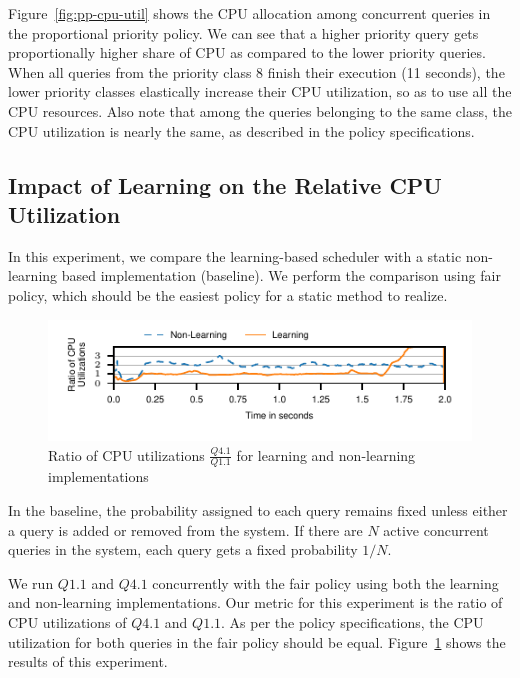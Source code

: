 Figure~\ref{fig:pp-cpu-util} shows the CPU allocation among concurrent queries in the proportional priority policy.
We can see that a higher priority query gets proportionally higher share of CPU as 
compared to the lower priority queries.
When all queries from the priority class 8 finish their execution (11 seconds), the 
lower priority classes elastically increase their CPU utilization, so as to use all the CPU 
resources. 
Also note that among the queries belonging to the same class, the CPU utilization is 
nearly the same, as described in the policy specifications.

\subsection{Impact of Learning on the Relative CPU Utilization}\label{ssec:learning-impact-cpu-util}

In this experiment, we compare the learning-based scheduler with a static non-learning based implementation (baseline).
We perform the comparison using fair policy, which should be the easiest policy for a static method to realize.

\begin{figure}
	\centering
	\includegraphics[width=\columnwidth]{policy/figures/q1-q11-ratio-cpu-util.pdf}
	\caption{Ratio of CPU utilizations  $\frac{Q4.1}{Q1.1}$ for learning and non-learning 
		implementations}
	\label{fig:non-learning-comparison}
\end{figure}

In the baseline, the probability assigned to each query remains fixed unless either a query is added or removed from the system.
If there are $N$ active concurrent queries in the system, each query gets a fixed probability $1/N$.

We run $Q1.1$ and $Q4.1$ concurrently with the fair policy using both the learning and 
non-learning implementations.
Our metric for this experiment is the ratio of CPU utilizations of $Q4.1$ and $Q1.1$.
As per the policy specifications, the CPU utilization for both queries in the fair policy 
should be equal. %
Figure~\ref{fig:non-learning-comparison} shows the results of this experiment.

